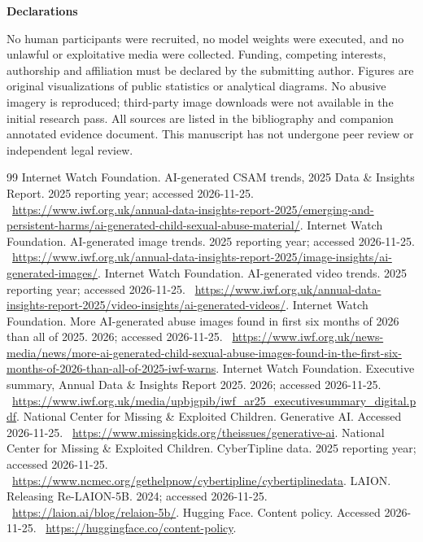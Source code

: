 \documentclass[10pt,a4paper]{article}
\newcommand{\sub}[1]{\vspace{1mm}\textbf{#1}\par}
\begin{document}
\sub{Declarations}

No human participants were recruited, no model weights were executed, and no unlawful or exploitative media were collected. Funding, competing interests, authorship and affiliation must be declared by the submitting author. Figures are original visualizations of public statistics or analytical diagrams. No abusive imagery is reproduced; third-party image downloads were not available in the initial research pass. All sources are listed in the bibliography and companion annotated evidence document. This manuscript has not undergone peer review or independent legal review.


\clearpage\begin{thebibliography}{99}\footnotesize\setlength{\itemsep}{0pt}\setlength{\parskip}{0pt}
 Internet Watch Foundation. AI-generated CSAM trends, 2025 Data \& Insights Report. 2025 reporting year; accessed 2026-11-25. \ \url{https://www.iwf.org.uk/annual-data-insights-report-2025/emerging-and-persistent-harms/ai-generated-child-sexual-abuse-material/}.
 Internet Watch Foundation. AI-generated image trends. 2025 reporting year; accessed 2026-11-25. \ \url{https://www.iwf.org.uk/annual-data-insights-report-2025/image-insights/ai-generated-images/}.
 Internet Watch Foundation. AI-generated video trends. 2025 reporting year; accessed 2026-11-25. \ \url{https://www.iwf.org.uk/annual-data-insights-report-2025/video-insights/ai-generated-videos/}.
 Internet Watch Foundation. More AI-generated abuse images found in first six months of 2026 than all of 2025. 2026; accessed 2026-11-25. \ \url{https://www.iwf.org.uk/news-media/news/more-ai-generated-child-sexual-abuse-images-found-in-the-first-six-months-of-2026-than-all-of-2025-iwf-warns}.
 Internet Watch Foundation. Executive summary, Annual Data \& Insights Report 2025. 2026; accessed 2026-11-25. \ \url{https://www.iwf.org.uk/media/upbjgpib/iwf_ar25_executivesummary_digital.pdf}.
 National Center for Missing \& Exploited Children. Generative AI. Accessed 2026-11-25. \ \url{https://www.missingkids.org/theissues/generative-ai}.
 National Center for Missing \& Exploited Children. CyberTipline data. 2025 reporting year; accessed 2026-11-25. \ \url{https://www.ncmec.org/gethelpnow/cybertipline/cybertiplinedata}.
 LAION. Releasing Re-LAION-5B. 2024; accessed 2026-11-25. \ \url{https://laion.ai/blog/relaion-5b/}.
 Hugging Face. Content policy. Accessed 2026-11-25. \ \url{https://huggingface.co/content-policy}.

\end{thebibliography}
\end{document}
